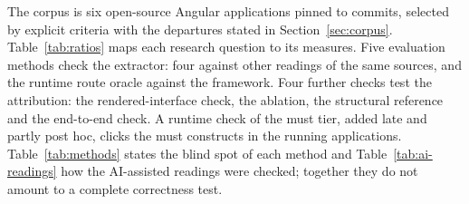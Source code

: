 The corpus is six open-source Angular applications pinned to commits, selected by explicit criteria with the departures stated in Section~\ref{sec:corpus}. Table~\ref{tab:ratios} maps each research question to its measures. Five evaluation methods check the extractor: four against other readings of the same sources, and the runtime route oracle against the framework. Four further checks test the attribution: the rendered-interface check, the ablation, the structural reference and the end-to-end check. A runtime check of the must tier, added late and partly post hoc, clicks the must constructs in the running applications. Table~\ref{tab:methods} states the blind spot of each method and Table~\ref{tab:ai-readings} how the AI-assisted readings were checked; together they do not amount to a complete correctness test.
